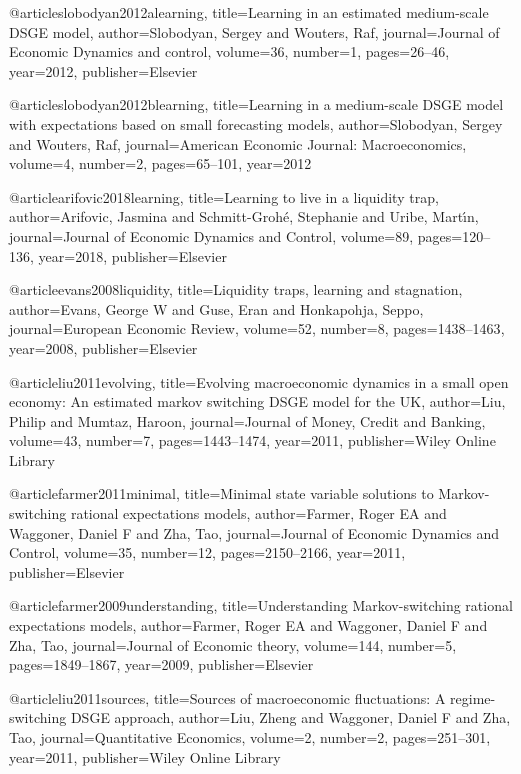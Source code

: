 @article{slobodyan2012alearning,
  title={Learning in an estimated medium-scale DSGE model},
  author={Slobodyan, Sergey and Wouters, Raf},
  journal={Journal of Economic Dynamics and control},
  volume={36},
  number={1},
  pages={26--46},
  year={2012},
  publisher={Elsevier}
}

@article{slobodyan2012blearning,
  title={Learning in a medium-scale DSGE model with expectations based on small forecasting models},
  author={Slobodyan, Sergey and Wouters, Raf},
  journal={American Economic Journal: Macroeconomics},
  volume={4},
  number={2},
  pages={65--101},
  year={2012}
}

@article{arifovic2018learning,
  title={Learning to live in a liquidity trap},
  author={Arifovic, Jasmina and Schmitt-Groh{\'e}, Stephanie and Uribe, Mart{\'\i}n},
  journal={Journal of Economic Dynamics and Control},
  volume={89},
  pages={120--136},
  year={2018},
  publisher={Elsevier}
}

@article{evans2008liquidity,
  title={Liquidity traps, learning and stagnation},
  author={Evans, George W and Guse, Eran and Honkapohja, Seppo},
  journal={European Economic Review},
  volume={52},
  number={8},
  pages={1438--1463},
  year={2008},
  publisher={Elsevier}
}

@article{liu2011evolving,
  title={Evolving macroeconomic dynamics in a small open economy: An estimated markov switching DSGE model for the UK},
  author={Liu, Philip and Mumtaz, Haroon},
  journal={Journal of Money, Credit and Banking},
  volume={43},
  number={7},
  pages={1443--1474},
  year={2011},
  publisher={Wiley Online Library}
}

@article{farmer2011minimal,
  title={Minimal state variable solutions to Markov-switching rational expectations models},
  author={Farmer, Roger EA and Waggoner, Daniel F and Zha, Tao},
  journal={Journal of Economic Dynamics and Control},
  volume={35},
  number={12},
  pages={2150--2166},
  year={2011},
  publisher={Elsevier}
}


@article{farmer2009understanding,
  title={Understanding Markov-switching rational expectations models},
  author={Farmer, Roger EA and Waggoner, Daniel F and Zha, Tao},
  journal={Journal of Economic theory},
  volume={144},
  number={5},
  pages={1849--1867},
  year={2009},
  publisher={Elsevier}
}

@article{liu2011sources,
  title={Sources of macroeconomic fluctuations: A regime-switching DSGE approach},
  author={Liu, Zheng and Waggoner, Daniel F and Zha, Tao},
  journal={Quantitative Economics},
  volume={2},
  number={2},
  pages={251--301},
  year={2011},
  publisher={Wiley Online Library}
}


